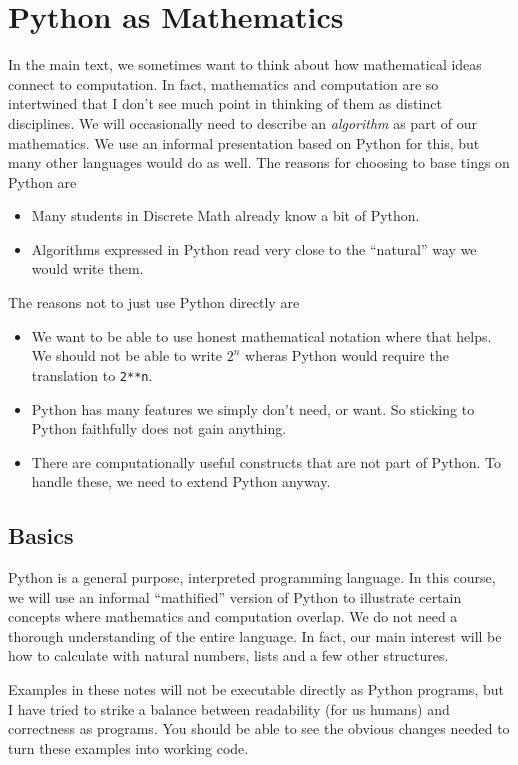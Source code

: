 \chapter{Python as Mathematics}

In the main text, we sometimes want to think about how mathematical ideas connect to computation. 
In fact, mathematics and computation are so intertwined that I don't see much point in thinking of them as distinct disciplines. 
We will occasionally need to describe an \emph{algorithm} as part of our mathematics. We use an informal presentation based on Python for this, but many other languages would do as well. The reasons for choosing to base tings on Python are

\begin{itemize}
	\item Many students in Discrete Math already know a bit of Python.
	\item Algorithms expressed in Python read very close to the ``natural'' way we would write them.
\end{itemize}

The reasons not to just use Python directly are
\begin{itemize}
	\item We want to be able to use honest mathematical notation where that helps. We should not be able to write $2^n$ wheras Python would require the translation to \lstinline|2**n|.
	\item Python has many features we simply don't need, or want. So sticking to Python faithfully does not gain anything.
	\item There are computationally useful constructs that are not part of Python. To handle these, we need to extend Python anyway.
\end{itemize}

\section{Basics}

Python is a general purpose, interpreted programming language. In this
course, we will use an informal ``mathified'' version of Python to
illustrate certain concepts where mathematics and computation
overlap. We do not need a thorough understanding of the entire
language. In fact, our main interest will be how to calculate with
natural numbers, lists and a few other structures.

Examples in these notes will not be executable directly as Python
programs, but I have tried to strike a balance between readability
(for us humans) and correctness as programs. You should be able to see
the obvious changes needed to turn these examples into working code.


